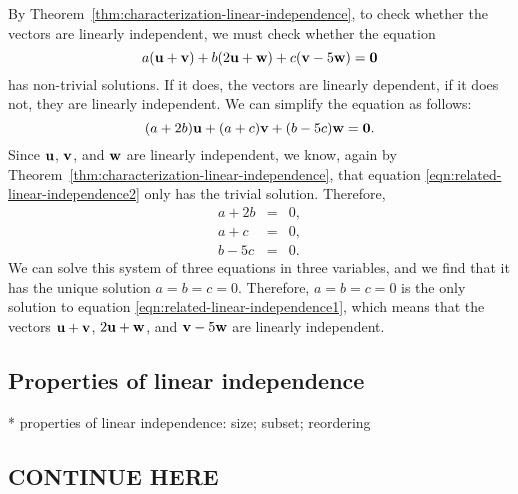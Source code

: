 \begin{solution}
  By Theorem~\ref{thm:characterization-linear-independence}, to check
  whether the vectors are linearly independent, we must check whether
  the equation
  \begin{equation}\label{eqn:related-linear-independence1}
    a(\mbox{\bf u}+\mbox{\bf v}) + b(2\mbox{\bf u}+\mbox{\bf w}) +
    c(\mbox{\bf v}-5\mbox{\bf w})=\mbox{\bf 0}
  \end{equation}
  has non-trivial solutions.  If it does, the vectors are linearly
  dependent, if it does not, they are linearly independent. We can
  simplify the equation as follows:
  \begin{equation}\label{eqn:related-linear-independence2}
    (a+2b)\mbox{\bf u} + (a+c)\mbox{\bf v} + (b-5c)\mbox{\bf w}=\mbox{\bf 0}.
  \end{equation}
  Since $\mbox{\bf u}$, $\mbox{\bf v}$, and $\mbox{\bf w}$ are linearly
  independent, we know, again by
  Theorem~\ref{thm:characterization-linear-independence}, that
  equation {\eqref{eqn:related-linear-independence2}} only has the
  trivial solution. Therefore,
  \begin{eqnarray*}
    a + 2b & = & 0, \\
    a + c & = & 0, \\
    b - 5c & = & 0. 
  \end{eqnarray*}
  We can solve this system of three equations in three variables, and
  we find that it has the unique solution $a=b=c=0$. Therefore,
  $a=b=c=0$ is the only solution to equation
  {\eqref{eqn:related-linear-independence1}}, which means that the
  vectors $\mbox{\bf u}+\mbox{\bf v}$, $2\mbox{\bf u}+\mbox{\bf w}$, and
  $\mbox{\bf v}-5\mbox{\bf w}$ are linearly independent.
\end{solution}

\subsection{Properties of linear independence}


* properties of linear independence: size; subset; reordering

\newpage



\subsection{CONTINUE HERE} %

